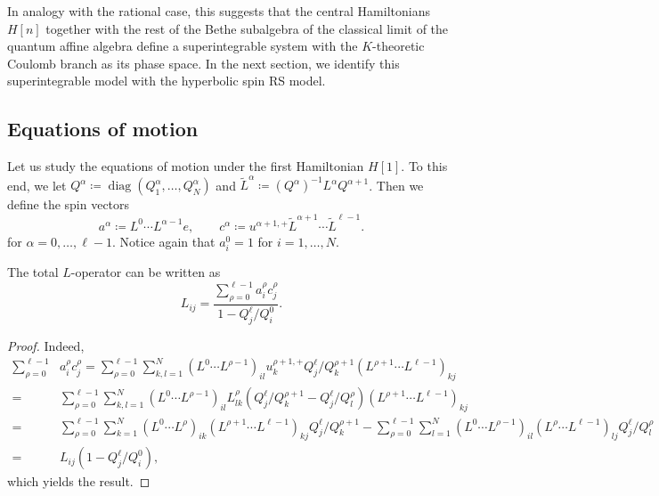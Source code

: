 In analogy with the rational case, this suggests that the central Hamiltonians $H[n]$ together with the rest of the Bethe subalgebra of the classical limit of the quantum affine algebra define a superintegrable system with the $K$-theoretic Coulomb branch as its phase space. In the next section, we identify this superintegrable model with the hyperbolic spin RS model.

\subsection{Equations of motion}\label{sec:hypEoms}

Let us study the equations of motion under the first Hamiltonian $H[1]$. To this end, we let $Q^\alpha \coloneq \operatorname{diag}(Q_1^\alpha,\dots,Q_N^\alpha)$ and $\tilde L^\alpha \coloneq (Q^\alpha)^{-1} L^\alpha Q^{\alpha+1}$. Then we define the spin vectors
\begin{equation}
    a^\alpha \coloneq L^0 \cdots L^{\alpha-1} e, \qquad c^\alpha \coloneq u^{\alpha+1,+} \tilde L^{\alpha+1} \cdots \tilde L^{\ell-1}.
\end{equation}
for $\alpha=0,\dots,\ell-1$. Notice again that $a_i^0 = 1$ for $i=1,\dots,N$.

\begin{lemma}\label{lemma:hypLOp}
    The total $L$-operator can be written as
    \begin{equation}
    L_{ij} = \frac{\sum_{\rho=0}^{\ell-1} a_i^\rho c_j^\rho}{1-Q_j^\ell/Q_i^0}.
\end{equation}
\end{lemma}

\begin{proof}
    Indeed,
    \begin{equation*}
        \begin{aligned}
            \sum_{\rho=0}^{\ell-1} &a_i^\rho c_j^\rho
            = \sum_{\rho=0}^{\ell-1} \sum_{k,l=1}^N (L^0 \cdots L^{\rho-1})_{il} u_k^{\rho+1,+}  Q_j^\ell/Q_k^{\rho+1} (L^{\rho+1} \cdots L^{\ell-1})_{kj} \\
            ={}& \sum_{\rho=0}^{\ell-1} \sum_{k,l=1}^N (L^0 \cdots L^{\rho-1})_{il} L_{lk}^{\rho} (Q_j^\ell/Q_k^{\rho+1}-Q_j^\ell/Q_l^{\rho}) (L^{\rho+1} \cdots L^{\ell-1})_{kj} \\
            ={}& \sum_{\rho=0}^{\ell-1} \sum_{k=1}^N (L^0 \cdots L^{\rho})_{ik} (L^{\rho+1} \cdots L^{\ell-1})_{kj} Q_j^\ell/Q_k^{\rho+1} - \sum_{\rho=0}^{\ell-1} \sum_{l=1}^N (L^0 \cdots L^{\rho-1})_{il} (L^{\rho} \cdots L^{\ell-1})_{lj} Q_j^\ell/Q_l^{\rho} \\
            ={}& L_{ij} (1 - Q_j^\ell/Q_i^0),
        \end{aligned}
    \end{equation*}
    which yields the result.
\end{proof}

